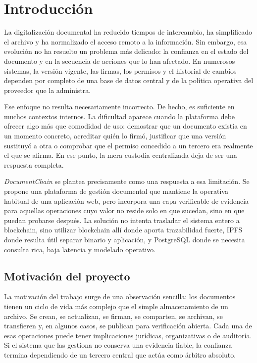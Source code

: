 \documentclass[11pt, a4paper]{article}
\begin{document}
\section{Introducción}

La digitalización documental ha reducido tiempos de intercambio, ha simplificado el archivo y ha normalizado el acceso remoto a la información. Sin embargo, esa evolución no ha resuelto un problema más delicado: la confianza en el estado del documento y en la secuencia de acciones que lo han afectado. En numerosos sistemas, la versión vigente, las firmas, los permisos y el historial de cambios dependen por completo de una base de datos central y de la política operativa del proveedor que la administra.

Ese enfoque no resulta necesariamente incorrecto. De hecho, es suficiente en muchos contextos internos. La dificultad aparece cuando la plataforma debe ofrecer algo más que comodidad de uso: demostrar que un documento existía en un momento concreto, acreditar quién lo firmó, justificar que una versión sustituyó a otra o comprobar que el permiso concedido a un tercero era realmente el que se afirma. En ese punto, la mera custodia centralizada deja de ser una respuesta completa.

\textit{DocumentChain} se plantea precisamente como una respuesta a esa limitación. Se propone una plataforma de gestión documental que mantiene la operativa habitual de una aplicación web, pero incorpora una capa verificable de evidencia para aquellas operaciones cuyo valor no reside solo en que sucedan, sino en que puedan probarse después. La solución no intenta trasladar el sistema entero a blockchain, sino utilizar blockchain allí donde aporta trazabilidad fuerte, IPFS donde resulta útil separar binario y aplicación, y PostgreSQL donde se necesita consulta rica, baja latencia y modelado operativo.

\subsection{Motivación del proyecto}

La motivación del trabajo surge de una observación sencilla: los documentos tienen un ciclo de vida más complejo que el simple almacenamiento de un archivo. Se crean, se actualizan, se firman, se comparten, se archivan, se transfieren y, en algunos casos, se publican para verificación abierta. Cada una de esas operaciones puede tener implicaciones jurídicas, organizativas o de auditoría. Si el sistema que las gestiona no conserva una evidencia fiable, la confianza termina dependiendo de un tercero central que actúa como árbitro absoluto.
\end{document}
